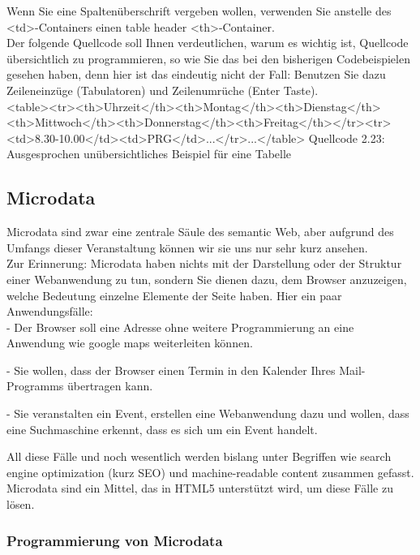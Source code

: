Wenn Sie eine Spaltenüberschrift vergeben wollen, verwenden Sie anstelle des <td>-Containers einen table header <th>-Container.\\

Der folgende Quellcode soll Ihnen verdeutlichen, warum es wichtig ist, Quellcode übersichtlich zu programmieren, so wie Sie das bei den bisherigen Codebeispielen gesehen haben, denn hier ist das eindeutig nicht der Fall: Benutzen Sie dazu Zeileneinzüge (Tabulatoren) und Zeilenumrüche (Enter Taste).\\

<table><tr><th>Uhrzeit</th><th>Montag</th><th>Dienstag</th><th>Mittwoch</th><th>Donnerstag</th><th>Freitag</th></tr><tr><td>8.30-10.00</td><td>PRG</td>...</tr>...</table>
Quellcode 2.23: Ausgesprochen unübersichtliches Beispiel für eine Tabelle

\subsection{Microdata}

Microdata sind zwar eine zentrale Säule des semantic Web, aber aufgrund des Umfangs dieser Veranstaltung können wir sie uns nur sehr kurz ansehen.\\

Zur Erinnerung: Microdata haben nichts mit der Darstellung oder der Struktur einer Webanwendung zu tun, sondern Sie dienen dazu, dem Browser anzuzeigen, welche Bedeutung einzelne Elemente der Seite haben. Hier ein paar Anwendungsfälle:\\

-	Der Browser soll eine Adresse ohne weitere Programmierung an eine Anwendung wie google maps weiterleiten können.

-	Sie wollen, dass der Browser einen Termin in den Kalender Ihres Mail-Programms übertragen kann.

-	Sie veranstalten ein Event, erstellen eine Webanwendung dazu und wollen, dass eine Suchmaschine erkennt, dass es sich um ein Event handelt.

All diese Fälle und noch wesentlich werden bislang unter Begriffen wie search engine optimization (kurz SEO) und machine-readable content zusammen gefasst. Microdata sind ein Mittel, das in HTML5 unterstützt wird, um diese Fälle zu lösen.

\subsubsection{Programmierung von Microdata}

